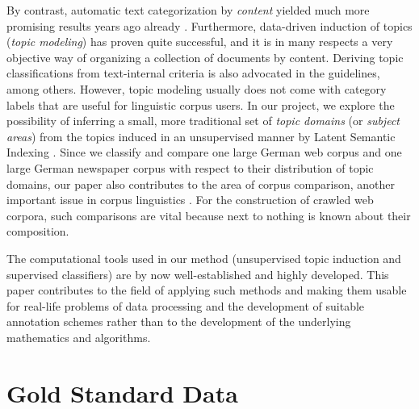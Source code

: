 \documentclass[11pt]{article}
\begin{document}
By contrast, automatic text categorization by \textit{content} yielded much more promising results years ago already \cite{Sebastiani2002}.
Furthermore, data-driven induction of topics (\textit{topic modeling}) has proven quite successful, and it is in many respects a very objective way of organizing a collection of documents by content.
Deriving topic classifications from text-internal criteria is also advocated in the  guidelines, among others.
However, topic modeling usually does not come with category labels that are useful for linguistic corpus users.
In our project, we explore the possibility of inferring a small, more traditional set of \textit{topic domains} (or \textit{subject areas}) from the topics induced in an unsupervised manner by Latent Semantic Indexing \cite{LandauerDumais1994,LandauerDumais1997}.
Since we classify and compare one large German web corpus and one large German newspaper corpus with respect to their distribution of topic domains, our paper also contributes to the area of corpus comparison, another important issue in corpus linguistics \cite{Kilgarriff2001,BiemannEa2013}.
For the construction of crawled web corpora, such comparisons are vital because next to nothing is known about their composition.

The computational tools used in our method (unsupervised topic induction and supervised classifiers) are by now well-established and highly developed.
This paper contributes to the field of applying such methods and making them usable for real-life problems of data processing and the development of suitable annotation schemes rather than to the development of the underlying mathematics and algorithms.

\section{Gold Standard Data}
\label{sec:goldstandard}
\end{document}
